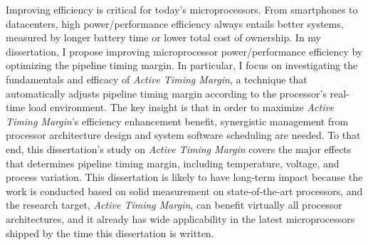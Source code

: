 
%
\utabstract
\indent

Improving efficiency is critical for today's microprocessors. From smartphones to datacenters, high power/performance efficiency always entails better systems, measured by longer battery time or lower total cost of ownership. In my dissertation, I propose improving microprocessor power/performance efficiency by optimizing the pipeline timing margin. In particular, I focus on investigating the fundamentals and efficacy of \textit{Active Timing Margin}, a technique that automatically adjusts pipeline timing margin according to the processor's real-time load environment. The key insight is that in order to maximize \textit{Active Timing Margin}'s efficiency enhancement benefit, synergistic management from processor architecture design and system software scheduling are needed. To that end, this dissertation's study on \textit{Active Timing Margin} covers the major effects that determines pipeline timing margin, including temperature, voltage, and process variation. This dissertation is likely to have long-term impact because the work is conducted based on solid measurement on state-of-the-art processors, and the research target, \textit{Active Timing Margin}, can benefit virtually all processor architectures, and it already has wide applicability in the latest microprocessors shipped by the time this dissertation is written.




